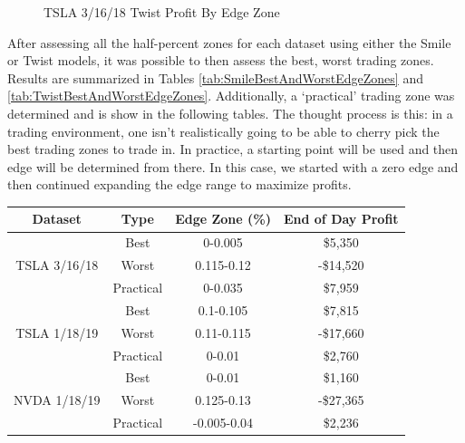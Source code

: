 \documentclass[12pt, a4paper, notitlepage]{article}
\numberwithin{equation}{subsection}
\numberwithin{figure}{subsection}
\numberwithin{table}{subsection}
\newcommand{\img}[3]
{
    \begin{figure}[H]
	\caption{#1}
	\centerline{\fbox{\texttt{[image: \#2]}}}
	\label{#3}
    \end{figure}
}
\begin{document}
\img{TSLA 3/16/18 Twist Profit By Edge Zone}{TSLA_Mar_Twist_ZonePnL}{fig:TSLA_Mar_Twist_ZonePnL}

After assessing all the half-percent zones for each dataset using either the Smile or Twist models, it was possible to then assess the best, worst trading zones.  Results are summarized in Tables \ref{tab:SmileBestAndWorstEdgeZones} and \ref{tab:TwistBestAndWorstEdgeZones}.  Additionally, a `practical' trading zone was determined and is show in the following tables.  The thought process is this:  in a trading environment, one isn't realistically going to be able to cherry pick the best trading zones to trade in.  In practice, a starting point will be used and then edge will be determined from there.  In this case, we started with a zero edge and then continued expanding the edge range to maximize profits. 

\begin{center}
    \captionsetup{hypcap=false}
    \label{tab:SmileBestAndWorstEdgeZones}
    \begin{tabular}{ |c|c|c|c| }
        \hline \rowcolor{LightGreen}
        \textbf{Dataset} & \textbf{Type}  & \textbf{Edge Zone (\%)} & \textbf{End of Day Profit} \\ \hline
        \multirow{3}{*}{TSLA 3/16/18}
        &   Best       &   0-0.005     &   \$5,350     \\
        &   Worst      &   0.115-0.12  &   -\$14,520   \\
        &   Practical  &   0-0.035     &   \$7,959     \\ \hline
        \multirow{3}{*}{TSLA 1/18/19}
        &   Best       &   0.1-0.105   &   \$7,815     \\ 
        &   Worst      &   0.11-0.115  &   -\$17,660   \\ 
        &   Practical  &   0-0.01      &   \$2,760     \\ \hline
        \multirow{3}{*}{NVDA 1/18/19}
        &   Best       &   0-0.01      &   \$1,160     \\ 
        &   Worst      &   0.125-0.13  &   -\$27,365   \\ 
        &   Practical  &   -0.005-0.04 &   \$2,236     \\ \hline
    \end{tabular}
\end{center}
\end{document}
